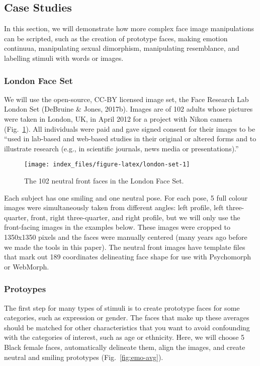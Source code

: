 \documentclass[
  doc,floatsintext]{apa6}
\begin{document}
\hypertarget{case-studies}{%
\subsection{Case Studies}\label{case-studies}}

In this section, we will demonstrate how more complex face image manipulations can be scripted, such as the creation of prototype faces, making emotion continuua, manipulating sexual dimorphism, manipulating resemblance, and labelling stimuli with words or images.

\hypertarget{london-face-set}{%
\subsubsection{London Face Set}\label{london-face-set}}

We will use the open-source, CC-BY licensed image set, the Face Research Lab London Set (DeBruine \& Jones, 2017b). Images are of 102 adults whose pictures were taken in London, UK, in April 2012 for a project with Nikon camera (Fig.~\ref{fig:london-set}). All individuals were paid and gave signed consent for their images to be ``used in lab-based and web-based studies in their original or altered forms and to illustrate research (e.g., in scientific journals, news media or presentations).''

\begin{figure}
\texttt{[image: index\_files/figure-latex/london-set-1]} \caption{The 102 neutral front faces in the London Face Set.}\label{fig:london-set}
\end{figure}

Each subject has one smiling and one neutral pose. For each pose, 5 full colour images were simultaneously taken from different angles: left profile, left three-quarter, front, right three-quarter, and right profile, but we will only use the front-facing images in the examples below. These images were cropped to 1350x1350 pixels and the faces were manually centered (many years ago before we made the tools in this paper). The neutral front images have template files that mark out 189 coordinates delineating face shape for use with Psychomorph or WebMorph.

\hypertarget{protoypes}{%
\subsubsection{Protoypes}\label{protoypes}}

The first step for many types of stimuli is to create prototype faces for some categories, such as expression or gender. The faces that make up these averages should be matched for other characteristics that you want to avoid confounding with the categories of interest, such as age or ethnicity. Here, we will choose 5 Black female faces, automatically delineate them, align the images, and create neutral and smiling prototypes (Fig.~\ref{fig:emo-avg}).
\end{document}
